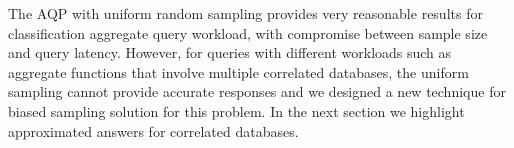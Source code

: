 The AQP with uniform random sampling provides very reasonable results for classification aggregate query workload, with compromise between sample size and query latency. However, for queries with different workloads such as aggregate functions that involve multiple correlated databases, the uniform sampling cannot provide accurate responses and we designed a new technique for biased sampling solution for this problem. In the next section we highlight approximated answers for correlated databases.